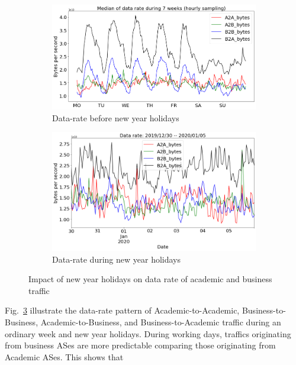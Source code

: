 \documentclass[10pt, journal, letterpaper]{IEEEtran}
\newcommand\linearFigSze{0.48}
\begin{document}
\begin{figure}
    \begin{subfigure}{\linearFigSze\textwidth}
          \centering
          \includegraphics[width=\columnwidth]{img/BCH_acaBus_bps.png}
          \caption{Data-rate before new year holidays}
          \label{fig:BCH_acaBus_bps}
    \end{subfigure}
    \begin{subfigure}{\linearFigSze\textwidth}
          \centering
          \includegraphics[width=\columnwidth]{img/CH2_acaBus_bps.png}
          \caption{Data-rate during new year holidays}
          \label{fig:CH_acaBus_bps}
    \end{subfigure}
    \caption{Impact of new year holidays on data rate of academic and business traffic}
    \label{fig:datarate_acaBus_BCH_CH}
\end{figure}
Fig.~\ref{fig:datarate_acaBus_BCH_CH} illustrate the data-rate pattern of Academic-to-Academic, Business-to-Business, Academic-to-Business, and Business-to-Academic traffic during an ordinary week and new year holidays. During working days, traffics originating from business ASes are more predictable comparing those originating from Academic ASes. This shows that 
\end{document}
